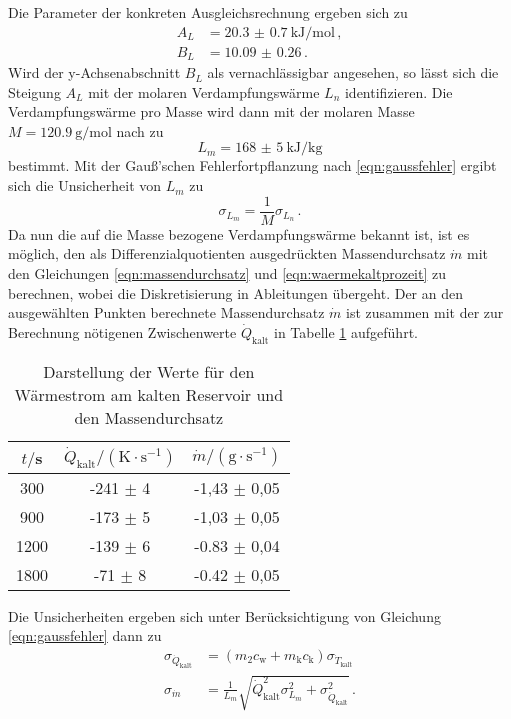 Die Parameter der konkreten Ausgleichsrechnung ergeben sich zu
\begin{align*}
  A_L &= \SI{20.3(07)}{\kilo\joule\per\mol}\,, \\
  B_L &= \SI{10.09(026)} \,.
\end{align*}
Wird der y-Achsenabschnitt $B_L$ als vernachlässigbar angesehen, so lässt sich die
Steigung $A_L$ mit der molaren Verdampfungswärme $L_n$ identifizieren.
Die Verdampfungswärme pro Masse wird dann mit der molaren Masse $M = \SI{120.9}{\gram\per\mol}$
nach \cite{molaremasse} zu
\begin{equation*}
  L_m = \SI{168(5)}{\kilo\joule\per\kilogram}
\end{equation*}
bestimmt. Mit der Gauß'schen Fehlerfortpflanzung nach \eqref{eqn:gaussfehler} ergibt sich
die Unsicherheit von $L_m$ zu
\begin{equation*}
  \sigma_{L_m} = \frac{1}{M} \sigma_{L_n}\,.
\end{equation*}
Da nun die auf die Masse bezogene Verdampfungswärme bekannt ist, ist es möglich, den
als Differenzialquotienten ausgedrückten Massendurchsatz $\dot{m}$ mit den Gleichungen
\eqref{eqn:massendurchsatz} und \eqref{eqn:waermekaltprozeit} zu berechnen, wobei die
Diskretisierung in Ableitungen übergeht.
Der an den ausgewählten Punkten berechnete Massendurchsatz $\dot{m}$ ist zusammen mit
der zur Berechnung nötigenen Zwischenwerte $\dot{Q}_\text{kalt}$ in Tabelle
\ref{tab:tabmassendurchsatz} aufgeführt.
\begin{table}
		\centering
    \caption{Darstellung der Werte für den Wärmestrom am kalten Reservoir und den Massendurchsatz}
    \label{tab:tabmassendurchsatz}
		\begin{tabular}{ccc}
			\toprule
			$t/$s & $\dot{Q}_\text{kalt}/(\text{K} \cdot \text{s}^{-1})$ & $\dot{m}/(\text{g} \cdot \text{s}^{-1})$ \\
			\midrule
      300  & -241 $\pm$ 4 & -1,43 $\pm$ 0,05 \\
      900  & -173 $\pm$ 5 & -1,03 $\pm$ 0,05 \\
      1200 & -139 $\pm$ 6 & -0.83 $\pm$ 0,04 \\
      1800 &  -71  $\pm$ 8 & -0.42 $\pm$ 0,05 \\
			\bottomrule
		\end{tabular}
	\end{table}
Die Unsicherheiten ergeben sich unter Berücksichtigung von Gleichung \eqref{eqn:gaussfehler} dann zu
\begin{align*}
  \sigma_{\dot{Q}_\text{kalt}} &= (m_2 c_\text{w} + m_\text{k} c_\text{k}) \sigma_{\dot{T}_\text{kalt}} \,\\
  \sigma_{\dot{m}} &= \frac{1}{L_m} \sqrt{\dot{Q}_\text{kalt}^2 \sigma_{L_m}^2 + \sigma_{\dot{Q}_\text{kalt}}^2}\,.
\end{align*}

